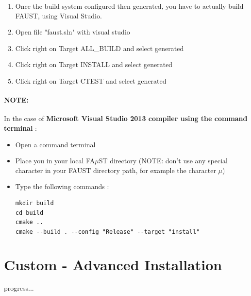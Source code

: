 \begin{enumerate}
\item Once the build system configured then generated, you have to actually build FAUST, using Visual Studio.
\item Open file "faust.sln" with visual studio 
\item Click right on Target ALL\_BUILD and select generated 
\item Click right on Target INSTALL and select generated 
\item Click right on Target CTEST and select generated 
\end{enumerate}


\bigbreak
\paragraph{NOTE:}In the case of \textbf{Microsoft Visual Studio 2013 compiler using the command terminal} :

\begin{itemize}
\item Open a command terminal
\item Place you in your local FA$\mu$ST directory (NOTE: don't use any special character in your FAUST directory path, for example the character $\mu$)
\item Type the following commands : 

\begin{lstlisting}
mkdir build
cd build
cmake .. 
cmake --build . --config "Release" --target "install"
\end{lstlisting}

\end{itemize}

\section{Custom - Advanced Installation}\label{sec:WinCustomInstall}

progress... 


